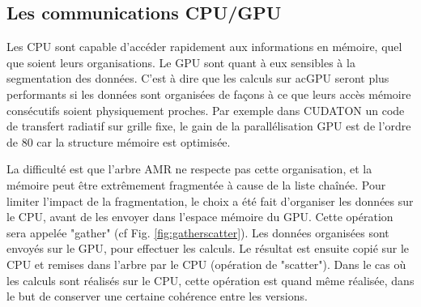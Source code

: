 



%
%
%
%


\subsection{Les communications CPU/GPU}
\label{sec:cpugpu}

Les \ac{CPU} sont capable d'accéder rapidement aux informations en mémoire, quel que soient leurs organisations.
Le \ac{GPU} sont quant à eux sensibles à la segmentation des données.
C'est à dire que les calculs sur ac{GPU} seront plus performants si les données sont organisées de façons à ce que leurs accès mémoire consécutifs soient physiquement proches.
Par exemple dans CUDATON \citep{aubert_radiative_2008} un code de transfert radiatif sur grille fixe, le gain de la parallélisation \ac{GPU} est de l'ordre de $80$ car la structure mémoire est optimisée.

La difficulté est que l'arbre \ac{AMR} ne respecte pas cette organisation, et la mémoire peut être extrêmement fragmentée à cause de la liste chaînée.
Pour limiter l'impact de la fragmentation, le choix a été fait d'organiser les données sur le CPU, avant de les envoyer dans l'espace mémoire du \ac{GPU}.
Cette opération sera appelée "gather" (cf Fig. \ref{fig:gatherscatter}).
Les données organisées sont envoyés sur le \ac{GPU}, pour effectuer les calculs.
Le résultat est ensuite copié sur le \ac{CPU} et remises dans l'arbre par le \ac{CPU} (opération de "scatter").
Dans le cas où les calculs sont réalisés sur le \ac{CPU}, cette opération est quand même réalisée, dans le but de conserver une certaine cohérence entre les versions.

